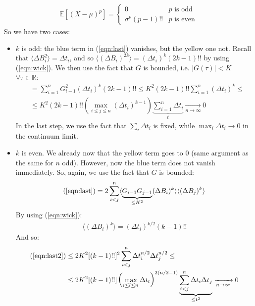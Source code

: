 \documentclass[../template.tex]{subfiles}
\begin{document}
\begin{exo}
    \begin{align} \label{eqn:wick}
        \mathbb{E}[(X-\mu)^p] = \begin{cases}
            0 & p \text{ is odd}\\
            \sigma^p(p-1)!! & p \text{ is even}
        \end{cases}
    \end{align}
    So we have two cases:
    \begin{itemize}
        \item $k$ is odd: the blue term in (\ref{eqn:last}) vanishes, but the yellow one not. Recall that $\langle \Delta B_i^2 \rangle = \Delta t_i$, and so $\langle (\Delta B_i)^{2k} \rangle = (\Delta t_i)^k (2k-1)!!$ by using (\ref{eqn:wick}).
        We then use the fact that $G$ is bounded, i.e.  $|G(\tau)| < K$ $\forall \tau \in \mathbb{R}$:
        \begin{align*}
            &= \sum_{i=1}^n G_{i-1}^2 (\Delta t_i)^k (2k-1)!! \leq K^2(2k-1)!!\sum_{i=1}^n (\Delta t_i)^k \leq\\
            &\leq K^2(2k-1)!! \left(\max_{i \leq j \leq n} (\Delta t_i)^{k-1}\right) \underbrace{\sum_{i=1}^n \Delta t_i}_{t}  \xrightarrow[n \to \infty]{}  0
        \end{align*}
        In the last step, we use the fact that $\sum_i \Delta t_i$ is fixed, while $\max_i \Delta t_i \to 0$ in the continuum limit.
        \item $k$ is even. We already now that the yellow term goes to $0$ (same argument as the same for $n$ odd). However, now the blue term does not vanish immediately. So, again, we use the fact that $G$ is bounded:
        \begin{align} \label{eqn:last2}
            (\ref{eqn:last}) = 2 \sum_{i<j}^n \langle \underbrace{G_{i-1} G_{j-1}}_{\leq K^2} (\Delta B_i)^k \rangle \langle (\Delta B_j)^k \rangle
        \end{align}
        By using (\ref{eqn:wick}):
        \begin{align*}
            \langle (\Delta B_i)^k \rangle = (\Delta t_i)^{k/2} (k-1)!!
        \end{align*}
        And so:
        \begin{align*}
            (\ref{eqn:last2}) &\leq 2 K^2 [(k-1)!!]^2 \sum_{i< j}^n \Delta t_i^{n/2} \Delta t_j^{n/2} \leq\\
            &\leq  2K^2[(k-1)!!] \left(\max_{i\leq l \leq n} \Delta t_l\right)^{2(n/2-1)} \underbrace{\sum_{i<j}^n \Delta t_i \Delta t_j}_{\leq t^2}  \xrightarrow[n \to \infty]{}  0
        \end{align*}


    \end{itemize}

\end{exo}
\end{document}
